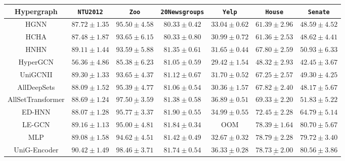 \documentclass[review]{elsarticle}
\begin{document}
\begin{table}[htbp]
{\begin{tabular}{ccccccc}
    \bottomrule
    \toprule
    Hypergraph & \texttt{NTU2012}          & \texttt{Zoo}       & \texttt{20Newsgroups}     & \texttt{Yelp}             & \texttt{House}            & \texttt{Senate} \\
    \midrule
    HGNN        & $87.72 \pm 1.35$ & $95.50 \pm 4.58$ & $80.33 \pm 0.42$ & $33.04 \pm 0.62$ & $61.39 \pm 2.96$ & $48.59 \pm 4.52$ \\
    HCHA        & $87.48 \pm 1.87$ & $93.65 \pm 6.15$ & $80.33 \pm 0.80$ &  $30.99 \pm 0.72$ & $61.36 \pm 2.53$ & $48.62 \pm 4.41$ \\
    HNHN        & $89.11 \pm 1.44$ & $93.59 \pm 5.88$ & $81.35 \pm 0.61$ & $31.65 \pm 0.44$ & $67.80 \pm 2.59$ & $50.93 \pm 6.33$ \\
    HyperGCN    & $56.36 \pm 4.86$ & $85.38 \pm 6.23$ & $81.05 \pm 0.59$ & $29.42 \pm 1.54$ & $48.32 \pm 2.93$ & $42.45 \pm 3.67$ \\
    UniGCNII    & $\underline{89.30 \pm 1.33}$ & $93.65 \pm 4.37$ & $81.12 \pm 0.67$ & $31.70 \pm 0.52$ & $67.25 \pm 2.57$ & $49.30 \pm 4.25$ \\
    AllDeepSets & $88.09 \pm 1.52$ & $95.39 \pm 4.77$ & $81.06 \pm 0.54$ & $30.36 \pm 1.57$ & $67.82 \pm 2.40$ & $48.17 \pm 5.67$ \\
    AllSetTransformer & $88.69 \pm 1.24$ & $\underline{97.50 \pm 3.59}$ & $81.38 \pm 0.58$ & $\mathbf{36.89 \pm 0.51}$ & $69.33 \pm 2.20$ & $51.83 \pm 5.22$  \\
    ED-HNN & $88.07 \pm 1.28$ & $95.77 \pm 3.37$ & $\mathbf{81.90 \pm 0.55}$ & $34.99 \pm 0.55$ & $72.45 \pm 2.28$ & $64.79 \pm 5.14$ \\
    LE-GCN  & $89.16 \pm 1.13$ & $95.00 \pm 4.81$ & $\underline{81.84 \pm 0.34}$ & OOM & $78.39 \pm 1.64$ & $\mathbf{80.70 \pm 5.67}$ \\
    MLP     & $89.08 \pm 1.58$  & $94.62 \pm 4.51$ & $81.42 \pm 0.49 $ & $32.67 \pm 0.32$ & $\mathbf{78.79 \pm 2.28}$ & $79.72 \pm 3.40$ \\
    \midrule
    UniG-Encoder & $\mathbf{90.42 \pm 1.49}$  & $\mathbf{98.46 \pm 3.71}$ & $81.74 \pm 0.54$ & $\underline{36.33 \pm 0.28}$ & $\underline{78.73 \pm 2.00}$ & $\underline{80.56 \pm 3.86}$ \\
    \bottomrule
  \end{tabular}
  }
\end{table}
\end{document}
